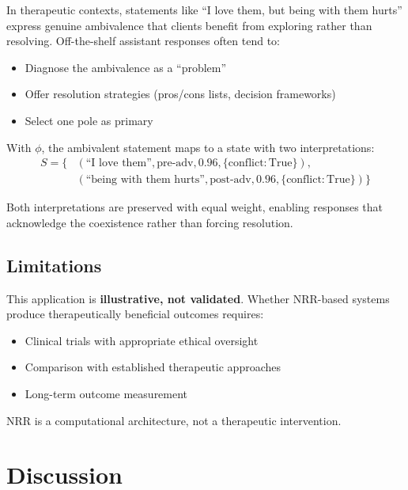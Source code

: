 \documentclass[11pt,a4paper]{article}
\begin{document}
In therapeutic contexts, statements like ``I love them, but being with them hurts'' 
express genuine ambivalence that clients benefit from exploring rather than resolving. 
Off-the-shelf assistant responses often tend to:
\begin{itemize}
    \item Diagnose the ambivalence as a ``problem''
    \item Offer resolution strategies (pros/cons lists, decision frameworks)
    \item Select one pole as primary
\end{itemize}

With $\phi$, the ambivalent statement maps to a state with two interpretations:
\begin{align*}
S = \{&(\text{``I love them''}, \text{pre-adv}, 0.96, \{\text{conflict}: \text{True}\}), \\
      &(\text{``being with them hurts''}, \text{post-adv}, 0.96, \{\text{conflict}: \text{True}\})\}
\end{align*}

Both interpretations are preserved with equal weight, enabling responses that 
acknowledge the coexistence rather than forcing resolution.

\subsection{Limitations}

This application is \textbf{illustrative, not validated}. Whether NRR-based systems 
produce therapeutically beneficial outcomes requires:
\begin{itemize}
    \item Clinical trials with appropriate ethical oversight
    \item Comparison with established therapeutic approaches
    \item Long-term outcome measurement
\end{itemize}

NRR is a computational architecture, not a therapeutic intervention.

\section{Discussion}
\label{sec:discussion}
\end{document}
